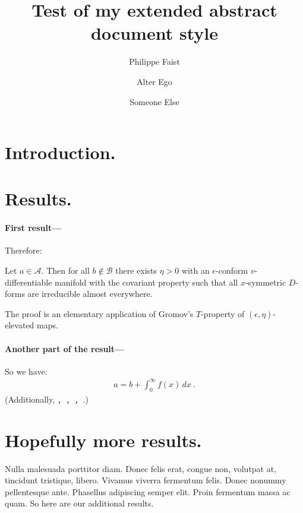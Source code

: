 \documentclass[
    papertype=a4paper,
]{phfextendedabstract}
\begin{document}
\title{Test of my extended abstract document style}
\author{Philippe Faist}
\author{Alter Ego}
\author{Someone Else}
\maketitle


\section{Introduction.}
\lipsum[1]

\section{Results.}
\lipsum[2]

\paragraph{First result---}
\lipsum[3]
Therefore:

\begin{theorem}
  Let $a\in \mathcal{A}$.  Then for all $b\notin\mathcal{B}$ there exists
  $\eta>0$ with an $\epsilon$-conform $v$-differentiable manifold with the
  covariant property such that all $x$-symmetric $D$-forms are irreducible
  almost everywhere.
\end{theorem}

The proof is an elementary application of Gromov's $T$-property of
$(\epsilon,\eta)$-elevated maps.

\paragraph{Another part of the result---}
\lipsum[4]
So we have:
\begin{align}
  a = b + \int_0^\infty f(x)\,dx\ .
\end{align}
(Additionally, \texttt{\the\abovedisplayskip, \the\belowdisplayskip,
  \the\abovedisplayshortskip, \the\belowdisplayshortskip}.)

\lipsum[5]


\section{Hopefully more results.}
Nulla malesuada porttitor diam. Donec felis erat, congue non, volutpat at,
tincidunt tristique, libero. Vivamus viverra fermentum felis. Donec nonummy
pellentesque ante. Phasellus adipiscing semper elit. Proin fermentum massa ac
quam.   So here are our additional results.
\end{document}
